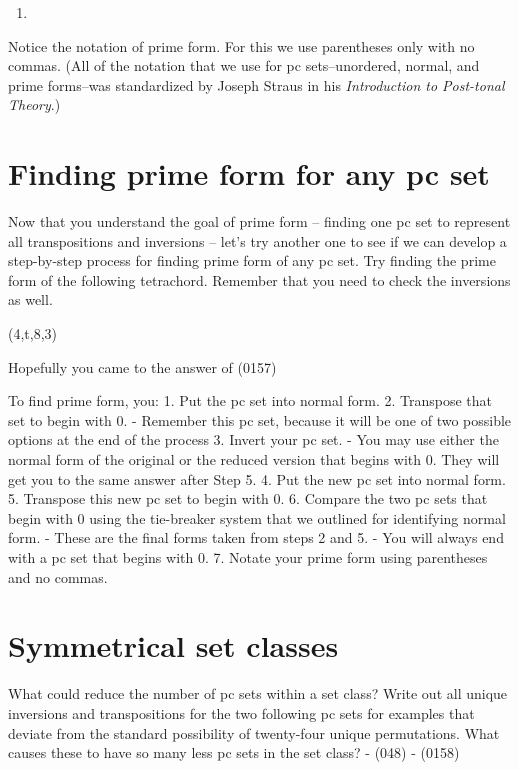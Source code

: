 \documentclass{book}
\providecommand{\tightlist}{%
  \setlength{\itemsep}{0pt}\setlength{\parskip}{0pt}}
\begin{document}
\begin{enumerate}
\def\labelenumi{(\arabic{enumi})}
\setcounter{enumi}{36}
\tightlist
\item
\end{enumerate}

Notice the notation of prime form. For this we use parentheses only with no
commas. (All of the notation that we use for pc sets--unordered, normal, and
prime forms--was standardized by Joseph Straus in his \emph{Introduction to
Post-tonal Theory}.)

\hypertarget{finding-prime-form-for-any-pc-set}{%
\section{Finding prime form for any pc
set}\label{finding-prime-form-for-any-pc-set}}

Now that you understand the goal of prime form -- finding one pc set to
represent all transpositions and inversions -- let's try another one to see if
we can develop a step-by-step process for finding prime form of any pc set.
Try finding the prime form of the following tetrachord. Remember that you need
to check the inversions as well.

(4,t,8,3)

Hopefully you came to the answer of (0157)

To find prime form, you: 1. Put the pc set into normal form. 2. Transpose that
set to begin with 0. - Remember this pc set, because it will be one of two
possible options at the end of the process 3. Invert your pc set. - You may
use either the normal form of the original or the reduced version that begins
with 0. They will get you to the same answer after Step 5. 4. Put the new pc
set into normal form. 5. Transpose this new pc set to begin with 0. 6. Compare
the two pc sets that begin with 0 using the tie-breaker system that we
outlined for identifying normal form. - These are the final forms taken from
steps 2 and 5. - You will always end with a pc set that begins with 0. 7.
Notate your prime form using parentheses and no commas.

\hypertarget{symmetrical-set-classes}{%
\section{Symmetrical set classes}\label{symmetrical-set-classes}}

What could reduce the number of pc sets within a set class? Write out all
unique inversions and transpositions for the two following pc sets for
examples that deviate from the standard possibility of twenty-four unique
permutations. What causes these to have so many less pc sets in the set class?
- (048) - (0158)
\end{document}
